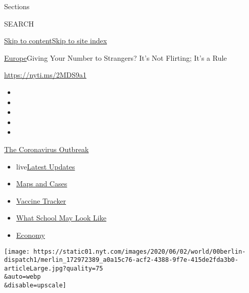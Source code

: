 Sections

SEARCH

\protect\hyperlink{site-content}{Skip to
content}\protect\hyperlink{site-index}{Skip to site index}

\href{/section/world/europe}{Europe}\textbar{}Giving Your Number to
Strangers? It's Not Flirting; It's a Rule

\url{https://nyti.ms/2MDS9a1}

\begin{itemize}
\item
\item
\item
\item
\item
\end{itemize}

\href{https://www.nytimes.com/news-event/coronavirus?action=click\&pgtype=Article\&state=default\&region=TOP_BANNER\&context=storylines_menu}{The
Coronavirus Outbreak}

\begin{itemize}
\tightlist
\item
  live\href{https://www.nytimes.com/2020/08/01/world/coronavirus-covid-19.html?action=click\&pgtype=Article\&state=default\&region=TOP_BANNER\&context=storylines_menu}{Latest
  Updates}
\item
  \href{https://www.nytimes.com/interactive/2020/us/coronavirus-us-cases.html?action=click\&pgtype=Article\&state=default\&region=TOP_BANNER\&context=storylines_menu}{Maps
  and Cases}
\item
  \href{https://www.nytimes.com/interactive/2020/science/coronavirus-vaccine-tracker.html?action=click\&pgtype=Article\&state=default\&region=TOP_BANNER\&context=storylines_menu}{Vaccine
  Tracker}
\item
  \href{https://www.nytimes.com/interactive/2020/07/29/us/schools-reopening-coronavirus.html?action=click\&pgtype=Article\&state=default\&region=TOP_BANNER\&context=storylines_menu}{What
  School May Look Like}
\item
  \href{https://www.nytimes.com/live/2020/07/31/business/stock-market-today-coronavirus?action=click\&pgtype=Article\&state=default\&region=TOP_BANNER\&context=storylines_menu}{Economy}
\end{itemize}

\texttt{[image: https://static01.nyt.com/images/2020/06/02/world/00berlin-dispatch1/merlin\_172972389\_a0a15c76-acf2-4388-9f7e-415de2fda3b0-articleLarge.jpg?quality=75\\\&auto=webp\\\&disable=upscale]}

